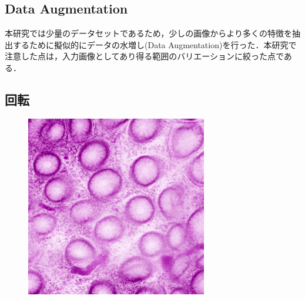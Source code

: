 \subsection{Data Augmentation}
本研究では少量のデータセットであるため，少しの画像からより多くの特徴を抽出するために擬似的にデータの水増し(Data Augmentation)を行った．本研究で注意した点は，入力画像としてあり得る範囲のバリエーションに絞った点である．

\subsection*{回転}

\begin{figure}[H]
	\centering
	
	\begin{minipage}{0.24\columnwidth}
		\centering
		\includegraphics[clip, width=\linewidth]{fig/preprocessing/data_aug/rotate/ROTATION_0}
		\subcaption{0\deg}
	\end{minipage}
	\begin{minipage}{0.24\columnwidth}
		\centering

\end{minipage}
\end{figure}

